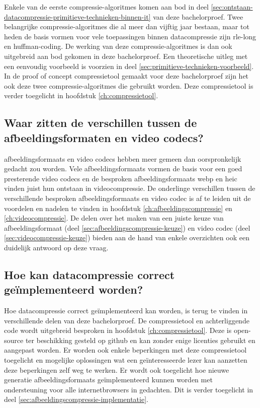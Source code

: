 Enkele van de eerste \glspl{compressie-algoritme} komen aan bod in deel \ref{sec:ontstaan-datacompressie-primitieve-technieken-binnen-it} van deze bachelorproef. Twee belangrijke \glspl{compressie-algoritme} die al meer dan vijftig jaar bestaan, maar tot heden de basis vormen voor vele toepassingen binnen \gls{datacompressie} zijn \gls{rle-long} en \gls{huffman-coding}. De werking van deze \glspl{compressie-algoritme} is dan ook uitgebreid aan bod gekomen in deze bachelorproef. Een theoretische uitleg met een eenvoudig voorbeeld is voorzien in deel \ref{sec:primitieve-technieken-voorbeeld}. In de proof of concept \gls{compressietool} gemaakt voor deze bachelorproef zijn het ook deze twee \glspl{compressie-algoritme} die gebruikt worden. Deze \gls{compressietool} is verder toegelicht in hoofdstuk \ref{ch:compressietool}.

\subsection*{Waar zitten de verschillen tussen de afbeeldingsformaten en video codecs?}
\label{sec:conclussie-onderzoeksvraag-3}

\Glspl{afbeeldingsformaat} en video \glspl{codec} hebben meer gemeen dan oorspronkelijk gedacht zou worden. Vele \glspl{afbeeldingsformaat} vormen de basis voor een goed presterende video \glspl{codec} en de besproken \glspl{afbeeldingsformaat} \gls{webp} en \gls{heic} vinden juist hun ontstaan in \gls{videocompressie}. De onderlinge verschillen tussen de verschillende besproken \glspl{afbeeldingsformaat} en video \gls{codec} is af te leiden uit de voordelen en nadelen te vinden in hoofdstuk \ref{ch:afbeeldingscompressie} en \ref{ch:videocompressie}. De delen over het maken van een juiste keuze van \gls{afbeeldingsformaat} (deel \ref{sec:afbeeldingscompressie-keuze}) en video \gls{codec} (deel \ref{sec:videocompressie-keuze}) bieden aan de hand van enkele overzichten ook een duidelijk antwoord op deze vraag.

\subsection*{Hoe kan datacompressie correct geïmplementeerd worden?}
\label{sec:conclussie-onderzoeksvraag-4}

Hoe \gls{datacompressie} correct geïmplementeerd kan worden, is terug te vinden in verschillende delen van deze bachelorproef. De \gls{compressietool} en achterliggende code wordt uitgebreid besproken in hoofdstuk \ref{ch:compressietool}. Deze is \gls{open-source} ter beschikking gesteld op \gls{github} en kan zonder enige licenties gebruikt en aangepast worden. Er worden ook enkele beperkingen met deze \gls{compressietool} toegelicht en mogelijke oplossingen wat een geïnteresseerde lezer kan aanzetten deze beperkingen zelf weg te werken. Er wordt ook toegelicht hoe nieuwe generatie \glspl{afbeeldingsformaat} geïmplementeerd kunnen worden met ondersteuning voor alle internetbrowsers in gedachten. Dit is verder toegelicht in deel \ref{sec:afbeeldingscompressie-implementatie}.

